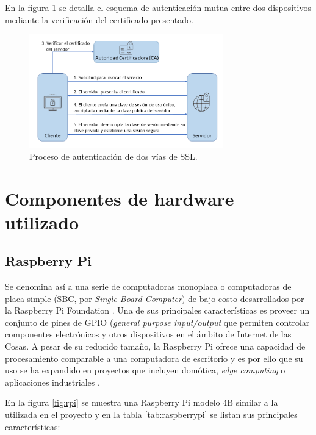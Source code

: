 En la figura \ref{fig:ssl2way} se detalla el esquema de autenticación mutua entre dos dispositivos mediante la verificación del certificado presentado.

\begin{figure}[h]
	\centering
	\includegraphics[width=0.75\textwidth]{./Figures/tls.png}
	\caption[Proceso de autenticación de dos vías de SSL.]{Proceso de autenticación de dos vías de SSL\protect\footnotemark.}
	\label{fig:ssl2way}

\end{figure}
	
\section{Componentes de hardware utilizado}
\label{sec:Hardware utilizado}

\subsection{Raspberry Pi}
\label{sec:Raspberry Pi}
Se denomina así a una serie de computadoras monoplaca o computadoras de placa simple (SBC, por \textit{Single Board Computer}) de bajo costo desarrollados por la Raspberry Pi Foundation \citep{raspberrypi:1}.
Una de sus principales características es proveer un conjunto de pines de GPIO (\textit{general purpose input/output} que permiten controlar componentes electrónicos y otros dispositivos en el ámbito de Internet de las Cosas.
A pesar de su reducido tamaño, la Raspberry Pi ofrece una capacidad de procesamiento comparable a una computadora de escritorio y es por ello que su uso se ha expandido en proyectos que incluyen domótica, \textit{edge computing} o aplicaciones industriales \citep{raspberrypi:2}. 

En la figura \ref{fig:rpi} se muestra una Raspberry Pi modelo 4B similar a la utilizada en el proyecto y en la tabla \ref{tab:raspberrypi} se listan sus principales características: 
 
